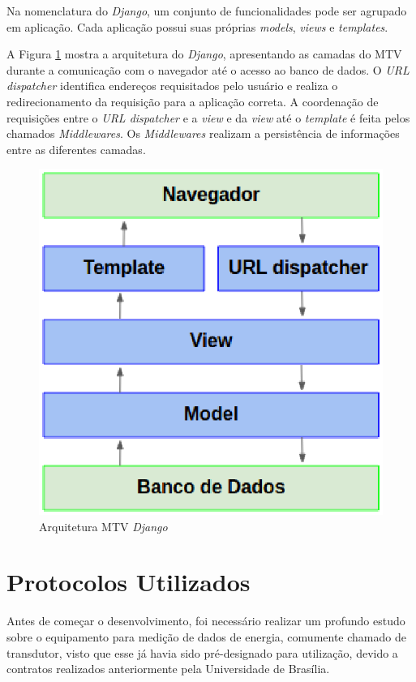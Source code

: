     Na nomenclatura do \textit{Django}, um conjunto de funcionalidades pode ser agrupado em aplicação. Cada aplicação possui suas próprias \textit{models}, \textit{views} e \textit{templates}.

    A Figura \ref{django-arq} mostra a arquitetura do \textit{Django}, apresentando as camadas do MTV durante a comunicação com o navegador até o acesso ao banco de dados. O \textit{URL dispatcher} identifica endereços requisitados pelo usuário e realiza o redirecionamento da requisição para a aplicação correta. A coordenação de requisições entre o \textit{URL dispatcher} e a \textit{view} e da \textit{view} até o \textit{template} é feita pelos chamados \textit{Middlewares}. Os \textit{Middlewares} realizam a persistência de informações entre as diferentes camadas.

    \begin{figure}[h]
        \centering
        \includegraphics[keepaspectratio=true,scale=0.5]{figuras/django-arquitetura.eps}
        \caption{Arquitetura MTV \textit{Django}}
        \label{django-arq}
    \end{figure}

\section{Protocolos Utilizados}
Antes de começar o desenvolvimento, foi necessário realizar um profundo estudo sobre o equipamento para medição de dados de energia, comumente chamado de transdutor, visto que esse já havia sido pré-designado para utilização, devido a contratos realizados anteriormente pela Universidade de Brasília.

